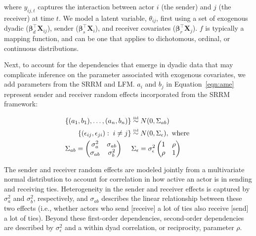 where $y_{ij,t}$ captures the interaction between actor $i$ (the sender) and $j$ (the receiver) at time $t$. We model a latent variable, $\theta_{ij}$, first using a set of exogenous dyadic ($\bm\beta_{d}^{\top} \mathbf{X}_{ij}$), sender ($\bm\beta_{s}^{\top} \mathbf{X}_{i}$), and receiver covariates ($\bm\beta_{r}^{\top} \mathbf{X}_{j}$). $f$ is typically a mapping function, and can be one that applies to dichotomous, ordinal, or continuous distributions.

Next, to account for the dependencies that emerge in dyadic data that may complicate inference on the parameter associated with exogenous covariates, we add parameters from the SRRM and LFM. $a_{i}$ and $b_{j}$ in Equation~\ref{eqn:ame} represent sender and receiver random effects incorporated from the SRRM framework:

\begin{align}
	\begin{aligned}
		\{ (a_{1}, b_{1}), \ldots, (a_{n}, b_{n}) \} &\simiid N(0,\Sigma_{ab}) \\
		\{ (\epsilon_{ij}, \epsilon_{ji}) : \; i \neq j\} &\simiid N(0,\Sigma_{\epsilon}), \text{ where } \\
		\Sigma_{ab} = \begin{pmatrix} \sigma_{a}^{2} & \sigma_{ab} \\ \sigma_{ab} & \sigma_{b}^2   \end{pmatrix} \;\;\;\;\; &\Sigma_{\epsilon} = \sigma_{\epsilon}^{2} \begin{pmatrix} 1 & \rho \\ \rho & 1  \end{pmatrix}
	\label{eqn:srm}
	\end{aligned}
\end{align}

The sender and receiver random effects are modeled jointly from a multivariate normal distribution to account for correlation in how active an actor is in sending and receiving ties. Heterogeneity in the sender and receiver effects is captured by $\sigma_{a}^{2}$ and $\sigma_{b}^{2}$, respectively, and $\sigma_{ab}$ describes the linear relationship between these two effects (i.e., whether actors who send [receive] a lot of ties also receive [send] a lot of ties). Beyond these first-order dependencies, second-order dependencies are described by $\sigma_{\epsilon}^{2}$ and a within dyad correlation, or reciprocity, parameter $\rho$.

